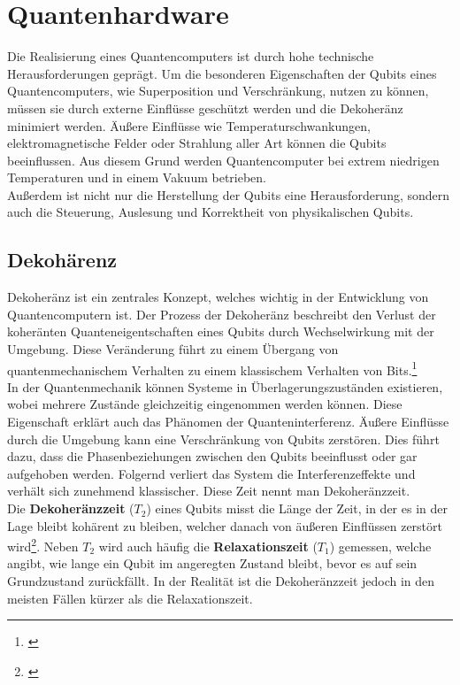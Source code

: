 \section{Quantenhardware}
\label{sec:quantenhardware}

Die Realisierung eines Quantencomputers ist durch hohe technische Herausforderungen geprägt. Um die besonderen Eigenschaften der Qubits eines Quantencomputers, wie Superposition und Verschränkung, nutzen zu können, müssen sie durch externe Einflüsse geschützt werden und die Dekoheränz minimiert werden.
Äußere Einflüsse wie Temperaturschwankungen, elektromagnetische Felder oder Strahlung aller Art können die Qubits beeinflussen. Aus diesem Grund werden Quantencomputer bei extrem niedrigen Temperaturen und in einem Vakuum betrieben.\\

Außerdem ist nicht nur die Herstellung der Qubits eine Herausforderung, sondern auch die Steuerung, Auslesung und Korrektheit von physikalischen Qubits.

\subsection{Dekohärenz}
\label{sub:dekohaerenz}
Dekoheränz ist ein zentrales Konzept, welches wichtig in der Entwicklung von Quantencomputern ist. Der Prozess der Dekoheränz beschreibt den Verlust der koheränten Quanteneigentschaften eines Qubits durch Wechselwirkung mit der Umgebung.
Diese Veränderung führt zu einem Übergang von quantenmechanischem Verhalten zu einem klassischem Verhalten von Bits.\footnote{\cite{breuer_decoherence_2007}}\\

In der Quantenmechanik können Systeme in Überlagerungszuständen existieren, wobei mehrere Zustände gleichzeitig eingenommen werden können. Diese Eigenschaft erklärt auch das Phänomen der Quanteninterferenz.
Äußere Einflüsse durch die Umgebung kann eine Verschränkung von Qubits zerstören. Dies führt dazu, dass die Phasenbeziehungen zwischen den Qubits beeinflusst oder gar aufgehoben werden.
Folgernd verliert das System die Interferenzeffekte und verhält sich zunehmend klassischer. Diese Zeit nennt man Dekoheränzzeit.\\

Die \textbf{Dekoheränzzeit} ($T_2$) eines Qubits misst die Länge der Zeit, in der es in der Lage bleibt kohärent zu bleiben, welcher danach von äußeren Einflüssen zerstört wird\footnote{\cite{bacciagaluppi_role_2020}}.
Neben $T_2$ wird auch häufig die \textbf{Relaxationszeit} ($T_1$) gemessen, welche angibt, wie lange ein Qubit im angeregten Zustand bleibt, bevor es auf sein Grundzustand zurückfällt.
In der Realität ist die Dekoheränzzeit jedoch in den meisten Fällen kürzer als die Relaxationszeit.\\

